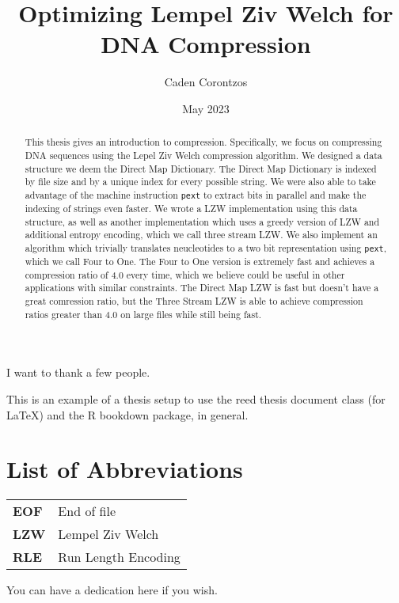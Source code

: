 \documentclass[12pt,twoside]{reedthesis}
\title{Optimizing Lempel Ziv Welch for DNA Compression}
\author{Caden Corontzos}
\date{May 2023}
\begin{document}
  \maketitle

\frontmatter %
\pagestyle{empty} %
  \begin{acknowledgements}
    I want to thank a few people.
  \end{acknowledgements}
  \begin{preface}
    This is an example of a thesis setup to use the reed thesis document class
    (for LaTeX) and the R bookdown package, in general.
  \end{preface}
\chapter*{List of Abbreviations}
\begin{table}[h]
    \centering
    \begin{tabular}{ll}
                \textbf{EOF} & End of file \\
                \textbf{LZW} & Lempel Ziv Welch \\
                \textbf{RLE} & Run Length Encoding \\
            \end{tabular}
\end{table}
  \hypersetup{linkcolor=black}
  \setcounter{secnumdepth}{2}
  \setcounter{tocdepth}{2}
  \tableofcontents

  \listoftables

  \listoffigures
  \begin{abstract}
    This thesis gives an introduction to compression. Specifically, we focus on compressing DNA sequences using the Lepel Ziv Welch compression algorithm. We designed a data structure we deem the Direct Map Dictionary. The Direct Map Dictionary is indexed by file size and by a unique index for every possible string. We were also able to take advantage of the machine instruction \texttt{pext} to extract bits in parallel and make the indexing of strings even faster. We wrote a LZW implementation using this data structure, as well as another implementation which uses a greedy version of LZW and additional entropy encoding, which we call three stream LZW. We also implement an algorithm which trivially translates neucleotides to a two bit representation using \texttt{pext}, which we call Four to One. The Four to One version is extremely fast and achieves a compression ratio of 4.0 every time, which we believe could be useful in other applications with similar constraints. The Direct Map LZW is fast but doesn't have a great comression ratio, but the Three Stream LZW is able to achieve compression ratios greater than 4.0 on large files while still being fast.
  \end{abstract}
  \begin{dedication}
    You can have a dedication here if you wish.
  \end{dedication}
\mainmatter %
\pagestyle{fancyplain} %
\end{document}
